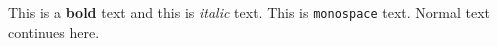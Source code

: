 \documentclass{article}
\begin{document}
This is a \textbf{bold} text and this is \textit{italic} text.
This is \texttt{monospace} text.
Normal text continues here.
\end{document}
